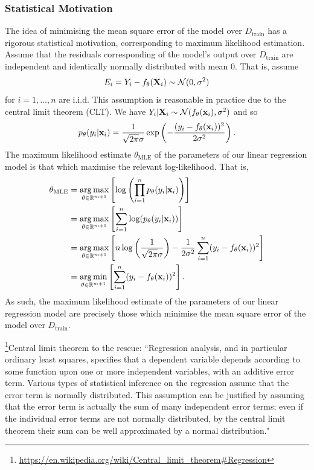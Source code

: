 \documentclass[11pt]{article}
\begin{document}
\subsubsection{Statistical Motivation}

The idea of minimising the mean square error of the model over $D_{\text{train}}$ has a rigorous statistical motivation, corresponding to maximum likelihood estimation. Assume that the residuals corresponding of the model's output over $D_{\text{train}}$ are independent and identically normally distributed with mean 0. That is, assume
$$
E_i
=
Y_i-f_{\theta}(\mathbf{X}_i)\sim\mathcal{N}(0, \sigma^2)
$$
for $i=1,\dots,n$ are i.i.d. This assumption is reasonable in practice due to the central limit theorem (CLT). We have $Y_i|\mathbf{X}_i\sim\mathcal{N}(f_{\theta}(\mathbf{x}_i), \sigma^2)$ and so
$$
p_{\theta}(y_i|\mathbf{x}_i)=\frac{1}{\sqrt{2\pi}\sigma}\exp\left(-\frac{(y_i-f_{\theta}(\mathbf{x}_i))^2}{2\sigma^2}\right).
$$
The maximum likelihood estimate $\theta_{\text{MLE}}$ of the parameters of our linear regression model is that which maximise the relevant log-likelihood. That is,
\begin{align*}
    \theta_{\text{MLE}}
    &=
    \operatorname*{arg\,max}_{\theta\in\mathbb{R}^{m+1}}\left[\log\left(\prod_{i=1}^n p_{\theta}(y_i|\mathbf{x}_i)\right)\right]\\
    &=
    \operatorname*{arg\,max}_{\theta\in\mathbb{R}^{m+1}}\left[\sum_{i=1}^n\log(p_{\theta}(y_i|\mathbf{x}_i))\right]\\
    &=
    \operatorname*{arg\,max}_{\theta\in\mathbb{R}^{m+1}}\left[n\log\left(\frac{1}{\sqrt{2\pi}\sigma}\right)-\frac{1}{2\sigma^2}\sum_{i=1}^n(y_i-f_{\theta}(\mathbf{x}_i))^2\right]\\
    &=
    \operatorname*{arg\,min}_{\theta\in\mathbb{R}^{m+1}}\left[\sum_{i=1}^n(y_i-f_{\theta}(\mathbf{x}_i))^2\right].
\end{align*}
As such, the maximum likelihood estimate of the parameters of our linear regression model are precisely those which minimise the mean square error of the model over $D_{\text{train}}$.

\begin{tcolorbox}[title={\centering\textbf{Are residuals really normally distributed?}}, colback=myLightBlue, colbacktitle=myDarkBlue, colframe=myDarkBlue, coltitle=white]
    \footnote{\url{https://en.wikipedia.org/wiki/Central\_limit\_theorem\#Regression}}Central limit theorem to the rescue: ``Regression analysis, and in particular ordinary least squares, specifies that a dependent variable depends according to some function upon one or more independent variables, with an additive error term. Various types of statistical inference on the regression assume that the error term is normally distributed. This assumption can be justified by assuming that the error term is actually the sum of many independent error terms; even if the individual error terms are not normally distributed, by the central limit theorem their sum can be well approximated by a normal distribution."
\end{tcolorbox}
\end{document}
